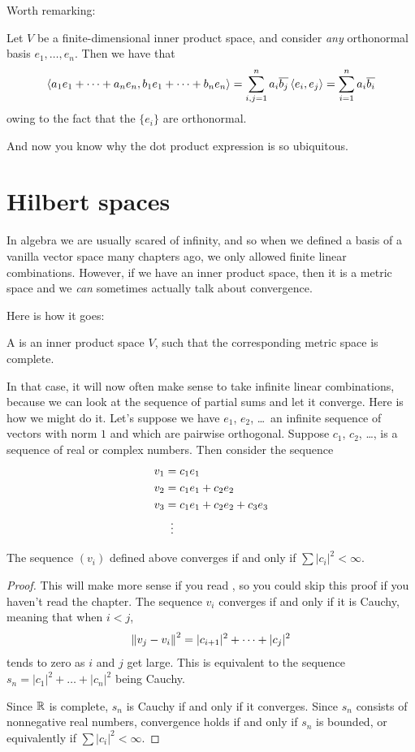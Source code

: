 Worth remarking:
\begin{example}
	Let $V$ be a finite-dimensional inner product space,
	and consider \emph{any} orthonormal basis $e_1, \dots, e_n$.
	Then we have that
	\[ \left< a_1 e_1 + \dots + a_n e_n,
		b_1 e_1 + \dots + b_n e_n \right>
		= \sum_{i,j=1}^n a_i\overline{b_j} \left< e_i, e_j \right>
		= \sum_{i=1}^n a_i \overline{b_i} \]
	owing to the fact that the $\{e_i\}$ are orthonormal.
\end{example}
And now you know why the dot product expression is so ubiquitous.

\section{Hilbert spaces}
In algebra we are usually scared of infinity,
and so when we defined a basis of a vanilla vector space many chapters ago,
we only allowed finite linear combinations.
However, if we have an inner product space,
then it is a metric space and we \emph{can}
sometimes actually talk about convergence.

Here is how it goes:
\begin{definition}
	A  is an inner product space $V$,
	such that the corresponding metric space is complete.
\end{definition}

In that case, it will now often make sense to take infinite linear combinations,
because we can look at the sequence of partial sums and let it converge.
Here is how we might do it.
Let's suppose we have $e_1$, $e_2$, \dots\ an infinite sequence
of vectors with norm $1$ and which are pairwise orthogonal.
Suppose $c_1$, $c_2$, \dots, is a sequence of real or complex numbers.
Then consider the sequence
\begin{align*}
	v_1 &= c_1 e_1 \\
	v_2 &= c_1 e_1 + c_2 e_2 \\
	v_3 &= c_1 e_1 + c_2 e_2 + c_3 e_3 \\
	&\vdotswithin=
\end{align*}

\begin{proposition}
	The sequence $(v_i)$ defined above
	converges if and only if $\sum \left\lvert c_i \right\rvert^2 < \infty$.
\end{proposition}
\begin{proof}
	This will make more sense if you read ,
	so you could skip this proof if you haven't read the chapter.
	The sequence $v_i$ converges if and only if it is Cauchy,
	meaning that when $i < j$,
	\[ \left\lVert v_j - v_i \right\rVert^2 = |c_{i+1}|^2 + \dots + |c_j|^2 \]
	tends to zero as $i$ and $j$ get large.
	This is equivalent to the sequence
	$s_n = |c_1|^2 + \dots + |c_n|^2$ being Cauchy.

	Since $\mathbb R$ is complete, $s_n$ is Cauchy
	if and only if it converges.
	Since $s_n$ consists of nonnegative real numbers,
	convergence holds if and only if $s_n$ is bounded,
	or equivalently if $\sum \left\lvert c_i \right\rvert^2 < \infty$.
\end{proof}

